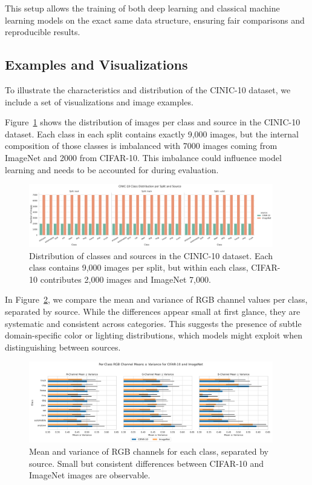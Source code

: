 This setup allows the training of both deep learning and classical machine learning models on the exact same data structure, ensuring fair 
comparisons and reproducible results.

\subsection{Examples and Visualizations}
\label{subsec:Examples and Visualizations}

To illustrate the characteristics and distribution of the CINIC-10 dataset, we include a set of visualizations and image examples.

Figure~\ref{fig:class-distribution} shows the distribution of images per class and source in the 
CINIC-10 dataset. Each class in each split contains exactly 9,000 images, but the internal composition of those classes is imbalanced with 7000
images coming from ImageNet and 2000 from CIFAR-10. This imbalance could influence model learning and needs to be accounted for during 
evaluation.

\begin{figure}[H]
    \centering
    \includegraphics[width=0.95\textwidth]{Plots/DatasetOverview/cinic10_class_distribution.pdf}
    \caption{Distribution of classes and sources in the CINIC-10 dataset. Each class contains 9,000 images per split, but within each class, CIFAR-10 contributes 2,000 images and ImageNet 7,000.}
    \label{fig:class-distribution}
\end{figure}

In Figure~\ref{fig:rgb-stats}, we compare the mean and variance of RGB channel values per class, 
separated by source. While the differences appear small at first glance, they are systematic and consistent across categories. This suggests the 
presence of subtle domain-specific color or lighting distributions, which models might exploit when distinguishing between sources.

\begin{figure}[H]
    \centering
    \includegraphics[width=0.95\textwidth]{Plots/DatasetOverview/rgb_means_variance_per_class.pdf}
    \caption{Mean and variance of RGB channels for each class, separated by source. Small but consistent differences between CIFAR-10 and ImageNet images are observable.}
    \label{fig:rgb-stats}
\end{figure}

